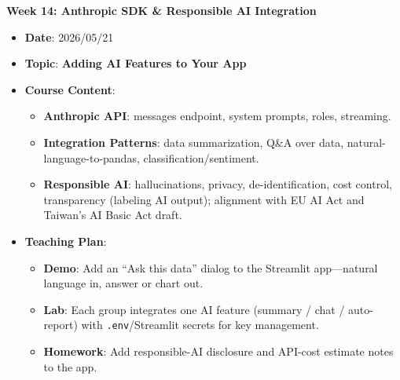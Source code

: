 \noindent\textbf{Week 14: Anthropic SDK \& Responsible AI Integration}
\begin{itemize}
    \item \textbf{Date}: 2026/05/21
    \item \textbf{Topic}: \textbf{Adding AI Features to Your App}
    \item \textbf{Course Content}:
    \begin{itemize}
        \item \textbf{Anthropic API}: messages endpoint, system prompts, roles, streaming.
        \item \textbf{Integration Patterns}: data summarization, Q\&A over data, natural-language-to-pandas, classification/sentiment.
        \item \textbf{Responsible AI}: hallucinations, privacy, de-identification, cost control, transparency (labeling AI output); alignment with EU AI Act and Taiwan's AI Basic Act draft.
    \end{itemize}
    \item \textbf{Teaching Plan}:
    \begin{itemize}
        \item \textbf{Demo}: Add an ``Ask this data'' dialog to the Streamlit app—natural language in, answer or chart out.
        \item \textbf{Lab}: Each group integrates one AI feature (summary / chat / auto-report) with \texttt{.env}/Streamlit secrets for key management.
        \item \textbf{Homework}: Add responsible-AI disclosure and API-cost estimate notes to the app.
    \end{itemize}
\end{itemize}

